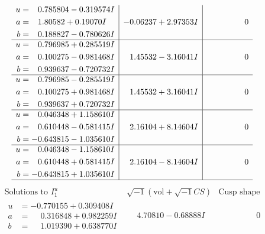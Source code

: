 \documentclass[1p]{elsarticle_modified}
\theoremstyle{definition}
\newcommand{\I}{\sqrt{-1}}
\begin{document}
$$\begin{array}{c|c|c}
\begin{aligned}
u &= \phantom{-}0.785804 - 0.319574 I \\
a &= \phantom{-}1.80582 + 0.19070 I \\
b &= \phantom{-}0.188827 - 0.780626 I\end{aligned}
 & -0.06237 + 2.97353 I & \phantom{-0.000000 } 0 \\ \hline\begin{aligned}
u &= \phantom{-}0.796985 + 0.285519 I \\
a &= \phantom{-}0.100275 - 0.981468 I \\
b &= \phantom{-}0.939637 - 0.720732 I\end{aligned}
 & \phantom{-}1.45532 - 3.16041 I & \phantom{-0.000000 } 0 \\ \hline\begin{aligned}
u &= \phantom{-}0.796985 - 0.285519 I \\
a &= \phantom{-}0.100275 + 0.981468 I \\
b &= \phantom{-}0.939637 + 0.720732 I\end{aligned}
 & \phantom{-}1.45532 + 3.16041 I & \phantom{-0.000000 } 0 \\ \hline\begin{aligned}
u &= \phantom{-}0.046348 + 1.158610 I \\
a &= \phantom{-}0.610448 - 0.581415 I \\
b &= -0.643815 - 1.035610 I\end{aligned}
 & \phantom{-}2.16104 + 8.14604 I & \phantom{-0.000000 } 0 \\ \hline\begin{aligned}
u &= \phantom{-}0.046348 - 1.158610 I \\
a &= \phantom{-}0.610448 + 0.581415 I \\
b &= -0.643815 + 1.035610 I\end{aligned}
 & \phantom{-}2.16104 - 8.14604 I & \phantom{-0.000000 } 0\\
 \hline 
 \end{array}$$\newpage$$\begin{array}{c|c|c}  
\text{Solutions to }I^u_{1}& \I (\text{vol} + \sqrt{-1}CS) & \text{Cusp shape}\\
 \hline 
\begin{aligned}
u &= -0.770155 + 0.309408 I \\
a &= \phantom{-}0.316848 + 0.982259 I \\
b &= \phantom{-}1.019390 + 0.638770 I\end{aligned}
 & \phantom{-}4.70810 - 0.68888 I & \phantom{-0.000000 } 0 \\ \hline\begin{aligned}

\end{aligned}
\end{array}$$
\end{document}
